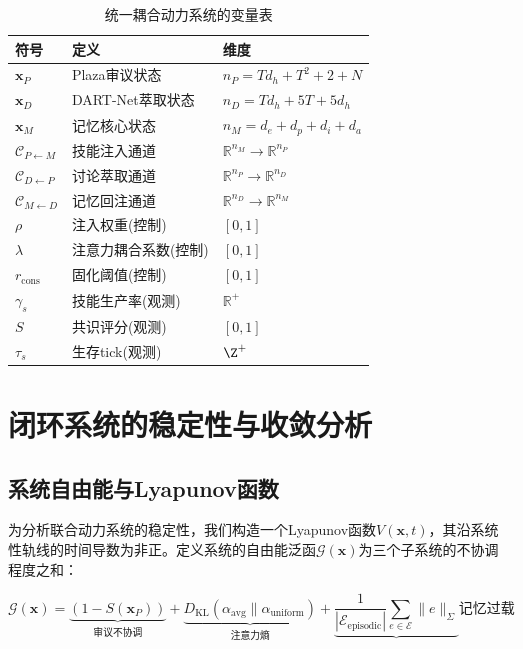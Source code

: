 \documentclass[twocolumn,10.5pt]{ctexart}
\def\R{\mathbb{R}}
\def\cE{\mathcal{E}}
\def\cG{\mathcal{G}}
\begin{document}
\begin{table}[t]
\centering
\caption{统一耦合动力系统的变量表}
\label{tab:variables}
\setlength{\tabcolsep}{2pt}
\renewcommand{\arraystretch}{1.15}
\begin{tabular}{lll}
\toprule
符号 & 定义 & 维度 \\
\midrule
$\mathbf{x}_P$ & Plaza审议状态 & $n_P = T d_h + T^2 + 2 + N$ \\
$\mathbf{x}_D$ & DART-Net萃取状态 & $n_D = T d_h + 5T + 5 d_h$ \\
$\mathbf{x}_M$ & 记忆核心状态 & $n_M = d_e + d_p + d_i + d_a$ \\
$\mathcal{C}_{P\leftarrow M}$ & 技能注入通道 & $\R^{n_M} \to \R^{n_P}$ \\
$\mathcal{C}_{D\leftarrow P}$ & 讨论萃取通道 & $\R^{n_P} \to \R^{n_D}$ \\
$\mathcal{C}_{M\leftarrow D}$ & 记忆回注通道 & $\R^{n_D} \to \R^{n_M}$ \\
$\rho$ & 注入权重(控制) & $[0,1]$ \\
$\lambda$ & 注意力耦合系数(控制) & $[0,1]$ \\
$r_{\text{cons}}$ & 固化阈值(控制) & $[0,1]$ \\
$\gamma_s$ & 技能生产率(观测) & $\R^+$ \\
$S$ & 共识评分(观测) & $[0,1]$ \\
$\tau_s$ & 生存tick(观测) & $\Z^+$ \\
\bottomrule
\end{tabular}
\end{table}

\section{闭环系统的稳定性与收敛分析}

\subsection{系统自由能与Lyapunov函数}

为分析联合动力系统的稳定性，我们构造一个Lyapunov函数$V(\mathbf{x}, t)$，其沿系统性轨线的时间导数为非正。定义系统的自由能泛函$\cG(\mathbf{x})$为三个子系统的不协调程度之和：

\begin{equation}
\cG(\mathbf{x}) = \underbrace{(1 - S(\mathbf{x}_P))}_{\text{审议不协调}} + \underbrace{D_{\text{KL}}(\alpha_{\text{avg}} \parallel \alpha_{\text{uniform}})}_{\text{注意力熵}} + \underbrace{\frac{1}{|\cE_{\text{episodic}}|}\sum_{e\in \cE} \|e\|_{\Sigma}}{\text{记忆过载}}
\label{eq:free_energy}
\end{equation}
\end{document}
